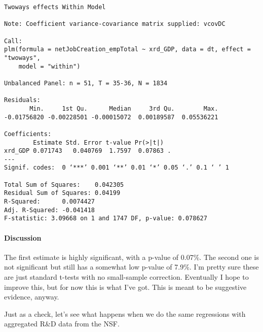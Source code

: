 \documentclass[11pt]{article}
\begin{document}
    
    \begin{verbatim}
Twoways effects Within Model

Note: Coefficient variance-covariance matrix supplied: vcovDC

Call:
plm(formula = netJobCreation_empTotal ~ xrd_GDP, data = dt, effect = "twoways", 
    model = "within")

Unbalanced Panel: n = 51, T = 35-36, N = 1834

Residuals:
       Min.     1st Qu.      Median     3rd Qu.        Max. 
-0.01756820 -0.00228501 -0.00015072  0.00189587  0.05536221 

Coefficients:
        Estimate Std. Error t-value Pr(>|t|)  
xrd_GDP 0.071743   0.040769  1.7597  0.07863 .
---
Signif. codes:  0 ‘***’ 0.001 ‘**’ 0.01 ‘*’ 0.05 ‘.’ 0.1 ‘ ’ 1

Total Sum of Squares:    0.042305
Residual Sum of Squares: 0.04199
R-Squared:      0.0074427
Adj. R-Squared: -0.041418
F-statistic: 3.09668 on 1 and 1747 DF, p-value: 0.078627
    \end{verbatim}

    
    \hypertarget{discussion}{%
\paragraph{Discussion}\label{discussion}}

The first estimate is highly significant, with a p-value of 0.07\%. The
second one is not significant but still has a somewhat low p-value of
7.9\%. I'm pretty sure these are just standard t-tests with no
small-sample correction. Eventually I hope to improve this, but for now
this is what I've got. This is meant to be suggestive evidence, anyway.

Just as a check, let's see what happens when we do the same regressions
with aggregated R\&D data from the NSF.
\end{document}
